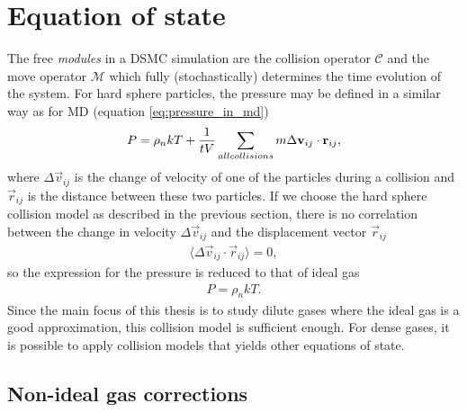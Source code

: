 \section{Equation of state}
\label{sec:dsmc_eos}
The free \textit{modules} in a DSMC simulation are the collision operator $\mathcal C$ and the move operator $\mathcal M$ which fully (stochastically) determines the time evolution of the system. For hard sphere particles, the pressure may be defined in a similar way as for MD (equation \eqref{eq:pressure_in_md})
\begin{align}
	P = \rho_nkT + {1\over tV}\sum_{all collisions} m\Delta \vec v_{ij}\cdot \vec r_{ij},
\end{align}
where $\Delta \vec v_{ij}$ is the change of velocity of one of the particles during a collision and $\vec r_{ij}$ is the distance between these two particles\cite{garcia1997direct}. If we choose the hard sphere collision model as described in the previous section, there is no correlation between the change in velocity $\Delta \vec v_{ij}$ and the displacement vector $\vec r_{ij}$
\begin{align}
	\langle \Delta \vec v_{ij}\cdot \vec r_{ij}\rangle = 0,
\end{align}
so the expression for the pressure is reduced to that of ideal gas
\begin{align}
	P = \rho_n kT.
\end{align}
Since the main focus of this thesis is to study dilute gases where the ideal gas is a good approximation, this collision model is sufficient enough. For dense gases, it is possible to apply collision models that yields other equations of state.
\subsection{Non-ideal gas corrections}